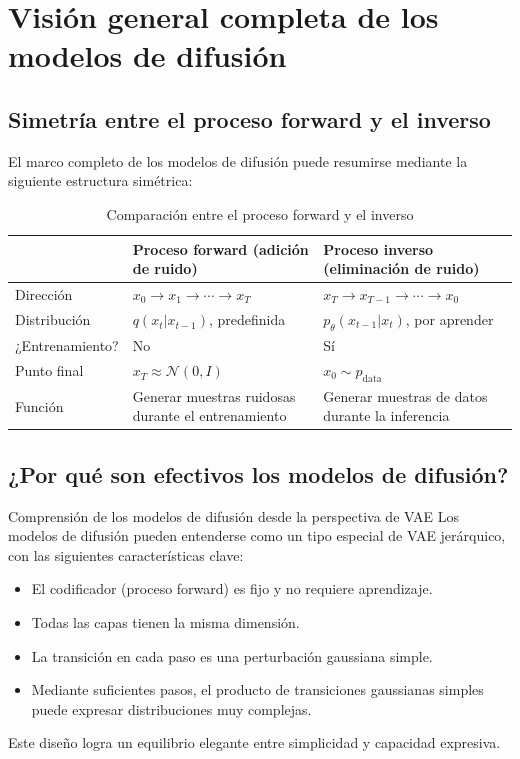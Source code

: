 \documentclass[a4paper]{article}
\begin{document}
\section{Visión general completa de los modelos de difusión}

\subsection{Simetría entre el proceso forward y el inverso}

El marco completo de los modelos de difusión puede resumirse mediante la siguiente estructura simétrica:

\begin{table}[H]
\centering
\begin{tabular}{lll}
\toprule
 & \textbf{Proceso forward (adición de ruido)} & \textbf{Proceso inverso (eliminación de ruido)} \\
\midrule
Dirección & $x_0 \to x_1 \to \cdots \to x_T$ & $x_T \to x_{T-1} \to \cdots \to x_0$ \\
Distribución & $q(x_t | x_{t-1})$, predefinida & $p_\theta(x_{t-1} | x_t)$, por aprender \\
¿Entrenamiento? & No & Sí \\
Punto final & $x_T \approx \mathcal{N}(0, I)$ & $x_0 \sim p_{\text{data}}$ \\
Función & Generar muestras ruidosas durante el entrenamiento & Generar muestras de datos durante la inferencia \\
\bottomrule
\end{tabular}
\caption{Comparación entre el proceso forward y el inverso}
\end{table}

\subsection{¿Por qué son efectivos los modelos de difusión?}

\begin{knowledgebox}{Comprensión de los modelos de difusión desde la perspectiva de VAE}
Los modelos de difusión pueden entenderse como un tipo especial de VAE jerárquico, con las siguientes características clave:
\begin{itemize}
    \item El codificador (proceso forward) es fijo y no requiere aprendizaje.
    \item Todas las capas tienen la misma dimensión.
    \item La transición en cada paso es una perturbación gaussiana simple.
    \item Mediante suficientes pasos, el producto de transiciones gaussianas simples puede expresar distribuciones muy complejas.
\end{itemize}
Este diseño logra un equilibrio elegante entre simplicidad y capacidad expresiva.
\end{knowledgebox}
\end{document}
